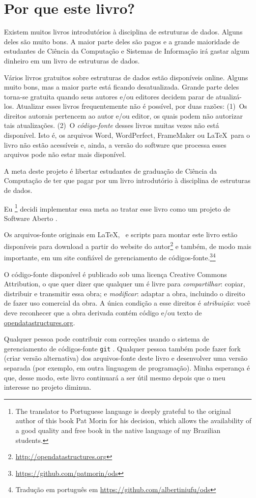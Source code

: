 \chapter*{Por que este livro?}

Existem muitos livros introdutórios à disciplina de estruturas de dados.
Alguns deles são muito bons. A maior parte deles são pagos e a
grande maioridade de estudantes de Ciência da Computação e Sistemas de
Informação irá gastar algum dinheiro em um livro de estruturas de dados.

Vários livros gratuitos sobre estruturas de dados estão disponíveis online.
Alguns muito bons, mas a maior parte está ficando desatualizada. Grande
parte deles torna-se gratuita quando seus autores e/ou editores decidem
parar de atualizá-los. Atualizar esses livros frequentemente não é possível,
por duas razões: (1)~Os direitos autorais pertencem ao autor e/ou editor,
os quais podem não autorizar tais atualizações. (2)~O \emph{código-fonte} desses
livros muitas vezes não está disponível. Isto é, os arquivos Word, WordPerfect,
FrameMaker ou \LaTeX\ para o livro não estão acessíveis e, ainda, a versão do
software que processa esses arquivos pode não estar mais disponível.

A meta deste projeto é libertar estudantes de graduação de Ciência da Computação
de ter que pagar por um livro introdutório à disciplina de estruturas de dados.

Eu
\footnote{The translator to Portuguese language is deeply grateful to the original author of this book Pat Morin for his decision, which allows the availability of a good quality and free book in the
native language of my Brazilian students.} decidi implementar essa meta ao tratar esse livro como um projeto de Software Aberto%
%
%
.

Os arquivos-fonte originais em \LaTeX, \lang\ e scripts para montar este livro estão disponíveis para download a partir do website do autor\footnote{\url{http://opendatastructures.org}}
e também, de modo mais importante, em um site confiável de gerenciamento de códigos-fonte.\footnote{\url{https://github.com/patmorin/ods}}\footnote{Tradução em português em \url{https://github.com/albertiniufu/ods}}

O código-fonte disponível é publicado sob uma licença
Creative Commons Attribution,
o que quer dizer que qualquer um é livre para \emph{compartilhar}:
copiar, distribuir e
transmitir essa obra; e \emph{modificar}:
adaptar a obra, incluindo o direito
de fazer uso comercial da obra.
A única condição a esse direitos é \emph{atribuição}:
você deve reconhecer que a obra derivada contém código e/ou texto de \url{opendatastructures.org}.

Qualquer pessoa pode contribuir com correções usando o sistema de gerenciamento
de códigos-fonte \texttt{git}%
%
. Qualquer pessoa também pode fazer fork (criar versão alternativa) dos arquivos-fonte deste livro e desenvolver uma versão separada (por exemplo, em outra linguagem de programação).
Minha esperança é que, desse modo, este livro continuará a
ser útil mesmo depois que o meu interesse no projeto diminua.
 

